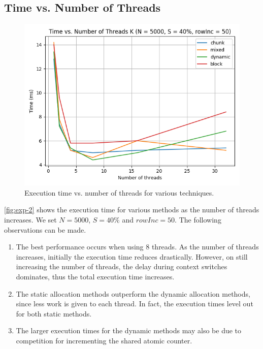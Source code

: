 \documentclass[conference,compsoc]{IEEEtran}
\begin{document}
\subsection{Time vs. Number of Threads}
\label{subsec:exp2}

\begin{figure}[!ht]
    \includegraphics[width=\columnwidth]{images/exp2.png}
    \caption{Execution time vs. number of threads for various techniques.}
    \label{fig:exp-2}
\end{figure}

\autoref{fig:exp-2} shows the execution time for various methods as the number
of threads increases. We set \(N = 5000\), \(S = 40\%\) and \(rowInc = 50\). The
following observations can be made.

\begin{enumerate}
    \item The best performance occurs when using 8 threads. As the number of
    threads increases, initially the execution time reduces drastically.
    However, on still increasing the number of threads, the delay during context
    switches dominates, thus the total execution time increases.
    \item The static allocation methods outperform the dynamic allocation
    methods, since less work is given to each thread. In fact, the execution
    times level out for both static methods.
    \item The larger execution times for the dynamic methods may also be due to
    competition for incrementing the shared atomic counter.
\end{enumerate}
\end{document}
